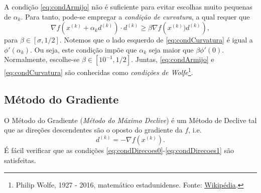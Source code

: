A condição \eqref{eq:condArmijo} não é suficiente para evitar escolhas muito pequenas de $\alpha_k$. Para tanto, pode-se empregar a \emph{condição de curvatura}, a qual requer que
\begin{equation}\label{eq:condCurvatura}
  \nabla f\left(x^{(k)} + \alpha_kd^{(k)}\right)\cdot d^{(k)} \geq \beta\nabla f\left(x^{(k)})d^{(k)}\right),
\end{equation}
para $\beta\in [\sigma, 1/2]$. Notemos que o lado esquerdo de \eqref{eq:condCurvatura} é igual a $\phi'(\alpha_k)$. Ou seja, este condição impõe que $\alpha_k$ seja maior que $\beta\phi'(0)$. Normalmente, escolhe-se $\beta\in [10^{-1}, 1/2]$. Juntas, \eqref{eq:condArmijo} e \eqref{eq:condCurvatura} são conhecidas como \emph{condições de Wolfe}\footnote{Philip Wolfe, 1927 - 2016, matemático estadunidense. Fonte: \href{https://pt.wikipedia.org/wiki/Philip_Wolfe}{Wikipédia}.}.

\subsection{Método do Gradiente}

O Método do Gradiente (\emph{Método do Máximo Declive}) é um Método de Declive tal que as direções descendentes são o oposto do gradiente da $f$, i.e.
\begin{equation}
  d^{(k)} = -\nabla f(x^{(k)}).
\end{equation}
É fácil verificar que as condições \eqref{eq:condDirecoes0}-\eqref{eq:condDirecoes1} são satisfeitas.

